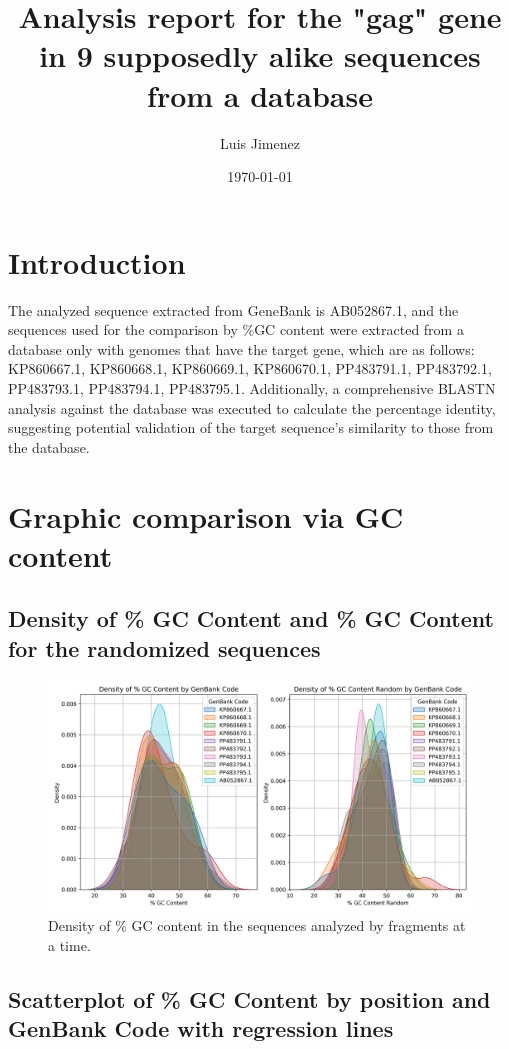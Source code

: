 \documentclass{article}%
\title{Analysis report for the "gag" gene in 9 supposedly alike sequences from a database}%
\author{Luis Jimenez}%
\date{\today}%
\begin{document}
%
\normalsize%
\maketitle%
\section{Introduction}%
\label{sec:Introduction}%
The analyzed sequence extracted from GeneBank is AB052867.1, and the sequences used for the comparison by \%GC content were extracted from a database only with genomes that have the target gene, which are as follows: KP860667.1, KP860668.1, KP860669.1, KP860670.1, PP483791.1, PP483792.1, PP483793.1, PP483794.1, PP483795.1. Additionally, a comprehensive BLASTN analysis against the database was executed to calculate the percentage identity, suggesting potential validation of the target sequence's similarity to those from the database.

%
\section{Graphic comparison via GC content}%
\label{sec:GraphiccomparisonviaGCcontent}%
\subsection{Density of \% GC Content and \% GC Content for the randomized sequences}%
\label{subsec:DensityofGCContentandGCContentfortherandomizedsequences}%


\begin{figure}[!htbp]%
\centering%
\includegraphics[width=1\textwidth]{density_gc.jpg}%
\caption{Density of \% GC content in the sequences analyzed by fragments at a time.}%
\end{figure}

%
\subsection{Scatterplot of \% GC Content by position and GenBank Code with regression lines}%
\label{subsec:ScatterplotofGCContentbypositionandGenBankCodewithregressionlines}%
\end{document}
